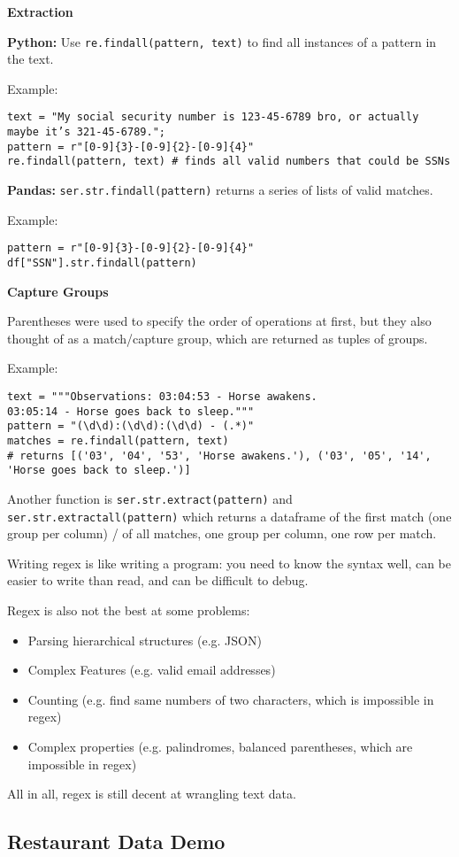 \textbf{Extraction}

\textbf{Python:} Use \texttt{re.findall(pattern, text)} to find all instances of a pattern in the text.

Example:
\begin{verbatim}
text = "My social security number is 123-45-6789 bro, or actually maybe it’s 321-45-6789.";
pattern = r"[0-9]{3}-[0-9]{2}-[0-9]{4}"
re.findall(pattern, text) # finds all valid numbers that could be SSNs
\end{verbatim}

\textbf{Pandas:} \texttt{ser.str.findall(pattern)} returns a series of lists of valid matches.

Example:
\begin{verbatim}
pattern = r"[0-9]{3}-[0-9]{2}-[0-9]{4}"
df["SSN"].str.findall(pattern)
\end{verbatim}

\textbf{Capture Groups}

Parentheses were used to specify the order of operations at first, but they also thought of as a match/capture group, which are returned as tuples of groups.

Example:
\begin{verbatim}
text = """Observations: 03:04:53 - Horse awakens.
03:05:14 - Horse goes back to sleep."""
pattern = "(\d\d):(\d\d):(\d\d) - (.*)"
matches = re.findall(pattern, text)
# returns [('03', '04', '53', 'Horse awakens.'), ('03', '05', '14', 'Horse goes back to sleep.')]
\end{verbatim}

\begin{notebox}
Another function is \texttt{ser.str.extract(pattern)} and \texttt{ser.str.extractall(pattern)} which returns a dataframe of the first match (one group per column) / of all matches, one group per column, one row per match.
\end{notebox}

\begin{notebox}
Writing regex is like writing a program: you need to know the syntax well, can be easier to write than read, and can be difficult to debug.

Regex is also not the best at some problems:
\begin{itemize}
\item Parsing hierarchical structures (e.g. JSON)
\item Complex Features (e.g. valid email addresses)
\item Counting (e.g. find same numbers of two characters, which is impossible in regex)
\item Complex properties (e.g. palindromes, balanced parentheses, which are impossible in regex)
\end{itemize}

All in all, regex is still decent at wrangling text data.
\end{notebox}

\subsection{Restaurant Data Demo}


